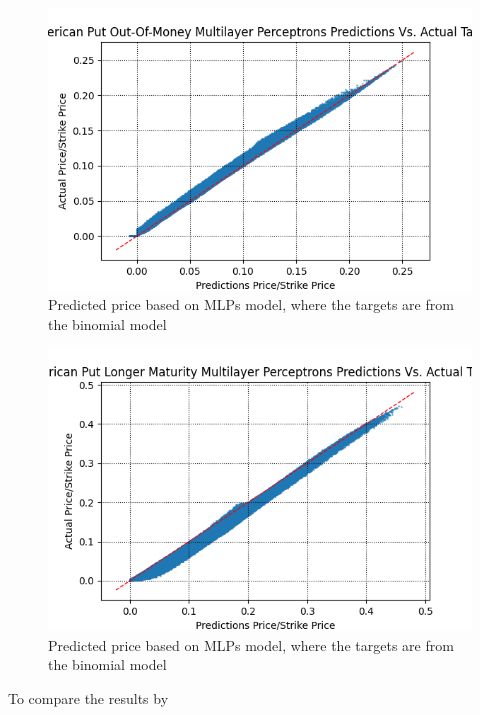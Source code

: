 \begin{figure}[H]
\centering
\includegraphics{Figures/PredictionOutMoneyAmerP.png}
\decoRule
\caption[MLPs Predictions Vs. Actual Prices For American Put]{Predicted price based on MLPs model, where the targets are from the binomial model}
\label{fig:PredictionOutMoneyAmerP}
\end{figure}

\begin{figure}[H]
\centering
\includegraphics{Figures/PredictionLongTAmerP.png}
\decoRule
\caption[MLPs Predictions Vs. Actual Prices For American Put]{Predicted price based on MLPs model, where the targets are from the binomial model}
\label{fig:PredictionOutMoneyAmerP}
\end{figure}

To compare the results by 

